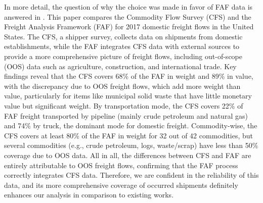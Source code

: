 In more detail, the question of why the choice was made in favor of FAF data is answered in \textcite{hu2022comparison}. This paper compares the Commodity Flow Survey (CFS) and the Freight Analysis Framework (FAF) for 2017 domestic freight flows in the United States. The CFS, a shipper survey, collects data on shipments from domestic establishments, while the FAF integrates CFS data with external sources to provide a more comprehensive picture of freight flows, including out-of-scope (OOS) data such as agriculture, construction, and international trade. Key findings reveal that the CFS covers 68\% of the FAF in weight and 89\% in value, with the discrepancy due to OOS freight flows, which add more weight than value, particularly for items like municipal solid waste that have little monetary value but significant weight. By transportation mode, the CFS covers 22\% of FAF freight transported by pipeline (mainly crude petroleum and natural gas) and 74\% by truck, the dominant mode for domestic freight. Commodity-wise, the CFS covers at least 80\% of the FAF in weight for 32 out of 42 commodities, but several commodities (e.g., crude petroleum, logs, waste/scrap) have less than 50\% coverage due to OOS data. All in all, the differences between CFS and FAF are entirely attributable to OOS freight flows, confirming that the FAF process correctly integrates CFS data. Therefore, we are confident in the reliability of this data, and its more comprehensive coverage of occurred shipments definitely enhances our analysis in comparison to existing works.




